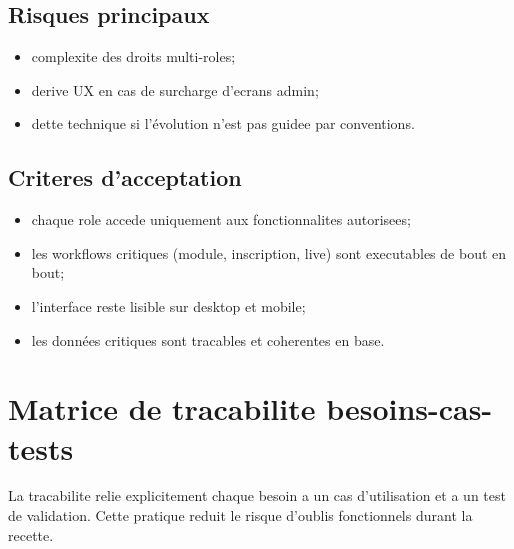 \documentclass[12pt,a4paper,oneside]{report}
\begin{document}
\subsection{Risques principaux}

\begin{itemize}
  \item complexite des droits multi-roles;
  \item derive UX en cas de surcharge d'ecrans admin;
  \item dette technique si l'évolution n'est pas guidee par conventions.
\end{itemize}

\subsection{Criteres d'acceptation}

\begin{itemize}
  \item chaque role accede uniquement aux fonctionnalites autorisees;
  \item les workflows critiques (module, inscription, live) sont executables de bout en bout;
  \item l'interface reste lisible sur desktop et mobile;
  \item les données critiques sont tracables et coherentes en base.
\end{itemize}

\section{Matrice de tracabilite besoins-cas-tests}

La tracabilite relie explicitement chaque besoin a un cas d'utilisation et a un test de validation. Cette pratique reduit le risque d'oublis fonctionnels durant la recette.
\end{document}
